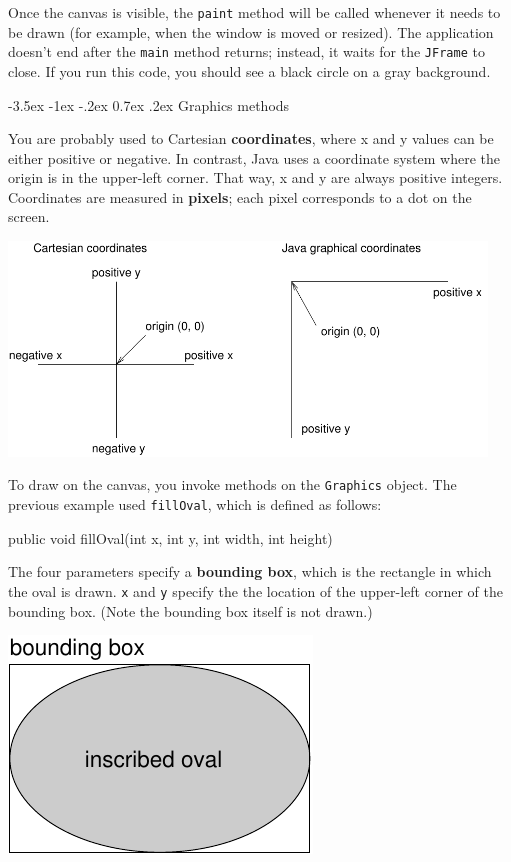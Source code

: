 \documentclass[12pt]{book}
\makeatletter
\theoremstyle{exercise}
\newcommand{\java}[1]{\verb"#1"}
\renewcommand{\section}{\@startsection{section}{1}{\z@}%
    {-3.5ex \@plus -1ex \@minus -.2ex}%
    {0.7ex \@plus.2ex}%
    {\normalfont\Large\bfseries}}
\newcommand{\java}[1]{\lstinline{#1}} %
\makeatother
\begin{document}
Once the canvas is visible, the \java{paint} method will be called whenever it needs to be drawn (for example, when the window is moved or resized).
The application doesn't end after the \java{main} method returns; instead, it waits for the \java{JFrame} to close.
If you run this code, you should see a black circle on a gray background.


\section{Graphics methods}


You are probably used to Cartesian {\bf coordinates}, where x and y values can be either positive or negative.
In contrast, Java uses a coordinate system where the origin is in the upper-left corner.
That way, x and y are always positive integers.
Coordinates are measured in {\bf pixels}; each pixel corresponds to a dot on the screen.

\begin{center}
\includegraphics[width=5in]{figs/coordinates.pdf}
\end{center}

To draw on the canvas, you invoke methods on the \java{Graphics} object.
The previous example used \java{fillOval}, which is defined as follows:

\begin{code}
    public void fillOval(int x, int y, int width, int height)
\end{code}


The four parameters specify a {\bf bounding box}, which is the rectangle in which the oval is drawn.
\java{x} and \java{y} specify the the location of the upper-left corner of the bounding box.
(Note the bounding box itself is not drawn.)

\begin{center}
\includegraphics{figs/circle.pdf}
\end{center}
\end{document}
